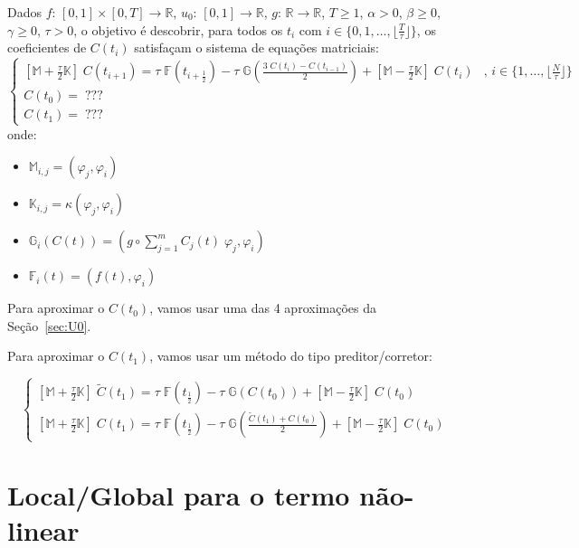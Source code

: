 \documentclass[a4paper]{article}
\newcommand{\typ}{:\,}
\newcommand{\vphi}{\varphi}
\begin{document}
Dados
\(f \typ [0, 1] \times [0, T] \to \mathbb{R}\),
\(u_0 \typ [0, 1] \to \mathbb{R}\),
\(g \typ \mathbb{R} \to \mathbb{R}\),
\(T \ge 1\),
\(\alpha > 0\),
\(\beta \ge 0\),
\(\gamma \ge 0\),
\(\tau > 0\),
o objetivo é descobrir,
para todos os \(t_i\)
com \(i \in \{ 0, 1, \dots, \lfloor \frac{T}{\tau} \rfloor \}\),
os coeficientes de \(C(t_i)\)
satisfaçam o sistema de equações matriciais:
\[ \begin{cases}
    \left[ \mathbb{M} + \frac\tau2 \mathbb{K} \right] \; C(t_{i+1})
    = \tau \; \mathbb{F}\left( t_{i+\frac12} \right)
    - \tau \; \mathbb{G}\left( \frac{3 \; C(t_i) - C(t_{i-1})}{2} \right)
    + \left[ \mathbb{M} - \frac\tau2 \mathbb{K} \right] \; C(t_i)
        &\text{, } i \in \{ 1, \dots, \lfloor \frac{N}{\tau} \rfloor \}
    \\
    C(t_0) = \; ???
    \\
    C(t_1) = \; ???
\end{cases} \]
onde:
\begin{itemize}
\item \(
    \mathbb{M}_{i, j} = (\vphi_j, \vphi_i)
\)
\item \(
    \mathbb{K}_{i, j} = \kappa(\vphi_j, \vphi_i)
\)
\item \(
    \mathbb{G}_{i}(C(t)) = (g \circ \sum_{j=1}^m{ C_j(t) \; \vphi_j }, \vphi_i)
\)
\item \(
    \mathbb{F}_i(t) = (f(t), \vphi_i)
\)
\end{itemize}

Para aproximar o \(C(t_0)\),
vamos usar uma das 4 aproximações da Seção~\ref{sec:U0}.

Para aproximar o \(C(t_1)\),
vamos usar um método do tipo preditor/corretor:

\[ \begin{cases}
    \left[ \mathbb{M} + \frac\tau2 \mathbb{K} \right] \; \tilde{C}(t_1)
    = \tau \; \mathbb{F}\left( t_{\frac12} \right)
    - \tau \; \mathbb{G}\left( C(t_0) \right)
    + \left[ \mathbb{M} - \frac\tau2 \mathbb{K} \right] \; C(t_0)
    \\
    \left[ \mathbb{M} + \frac\tau2 \mathbb{K} \right] \; C(t_1)
    = \tau \; \mathbb{F}\left( t_{\frac12} \right)
    - \tau \; \mathbb{G}\left( \frac{\tilde{C}(t_1) + C(t_0)}{2} \right)
    + \left[ \mathbb{M} - \frac\tau2 \mathbb{K} \right] \; C(t_0)
\end{cases} \]

\section{Local/Global para o termo não-linear}
\end{document}
